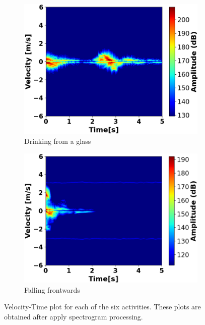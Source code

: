 \documentclass{l4proj}
\begin{document}
\begin{figure}[h]
\begin{subfigure}[b]{0.32\textwidth}
        \includegraphics[width=\textwidth]{images/Velocity-Time_5.png}
        \caption{Drinking from a glass}
        \label{fig:velocity-time5}
    \end{subfigure}
    \hfill
    \begin{subfigure}[b]{0.32\textwidth}
        \includegraphics[width=\textwidth]{images/Velocity-Time_6.png}
        \caption{Falling frontwards}
        \label{fig:velocity-time6}
    \end{subfigure}
  \caption{Velocity-Time plot for each of the six activities. These plots are obtained after apply spectrogram processing.}
  \label{fig:Velocity-Time Plots}
\end{figure}
\end{document}
